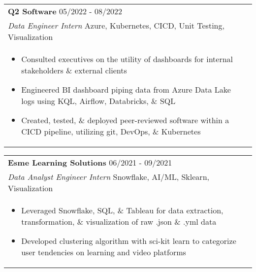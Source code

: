 {    %
    \begin{tabularx}{\linewidth}{ @{}l r@{} }
    \textbf{Q2 Software} \hfill 05/2022 - 08/2022 \\
    \textit{Data Engineer Intern} \hfill Azure, Kubernetes, CICD, Unit Testing, Visualization \\[4pt]
    \begin{minipage}[t]{\linewidth}
        \begin{itemize}[nosep,after=\strut, leftmargin=2em, itemsep=2pt]
            \item Consulted executives on the utility of dashboards for internal stakeholders \& external clients
            \item Engineered BI dashboard piping data from Azure Data Lake logs using KQL, Airflow, Databricks, \& SQL
            \item Created, tested, \& deployed peer-reviewed software within a CICD pipeline, utilizing git, DevOps, \& Kubernetes
        \end{itemize}
    \end{minipage}
    \end{tabularx}
    
    \begin{tabularx}{\linewidth}{ @{}l r@{} }
    \textbf{Esme Learning Solutions} \hfill 06/2021 - 09/2021 \\
    \textit{Data Analyst Engineer Intern} \hfill Snowflake, AI/ML, Sklearn, Visualization \\[4pt]
    \begin{minipage}[t]{\linewidth}
        \begin{itemize}[nosep,after=\strut, leftmargin=2em, itemsep=2pt]
            \item Leveraged Snowflake, SQL, \& Tableau for data extraction, transformation, \& visualization of raw .json \& .yml data
            \item Developed clustering algorithm with sci-kit learn to categorize user tendencies on learning and video platforms
        \end{itemize}
    \end{minipage}
    \end{tabularx}
}


\newcommand{\AES}{
    \begin{minipage}[t]{\linewidth}
        \begin{itemize}[nosep,after=\strut, leftmargin=2em, itemsep=2pt]
            \item Co-founded financial data consulting group, providing data infrastructure \& machine learning models
            \item Managed technical vision, system implementations, data pipelines, \& code base for a team of five
        \end{itemize}
    \end{minipage}
}


